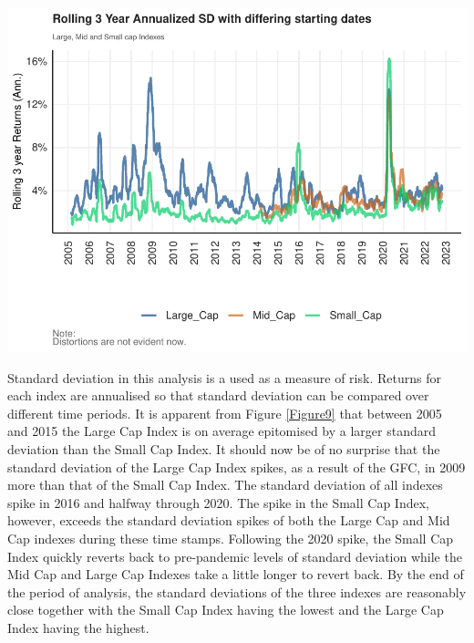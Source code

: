 \documentclass[11pt,preprint, authoryear]{elsarticle}
\let\origfigure\figure
\let\endorigfigure\endfigure
\renewenvironment{figure}[1][2] {
    \expandafter\origfigure\expandafter[H]
} {
    \endorigfigure
}
\numberwithin{equation}{section}
\numberwithin{figure}{section}
\numberwithin{table}{section}
\begin{document}
\begin{figure}[H]

{\centering \includegraphics{Volatility-of-Shares_files/figure-latex/Figure9-1} 

}

\caption{Rolling Annualised Standard Deviation of the Indexes \label{Figure9}}\label{fig:Figure9}
\end{figure}

Standard deviation in this analysis is a used as a measure of risk.
Returns for each index are annualised so that standard deviation can be
compared over different time periods. It is apparent from Figure
\ref{Figure9} that between 2005 and 2015 the Large Cap Index is on
average epitomised by a larger standard deviation than the Small Cap
Index. It should now be of no surprise that the standard deviation of
the Large Cap Index spikes, as a result of the GFC, in 2009 more than
that of the Small Cap Index. The standard deviation of all indexes spike
in 2016 and halfway through 2020. The spike in the Small Cap Index,
however, exceeds the standard deviation spikes of both the Large Cap and
Mid Cap indexes during these time stamps. Following the 2020 spike, the
Small Cap Index quickly reverts back to pre-pandemic levels of standard
deviation while the Mid Cap and Large Cap Indexes take a little longer
to revert back. By the end of the period of analysis, the standard
deviations of the three indexes are reasonably close together with the
Small Cap Index having the lowest and the Large Cap Index having the
highest.
\end{document}
